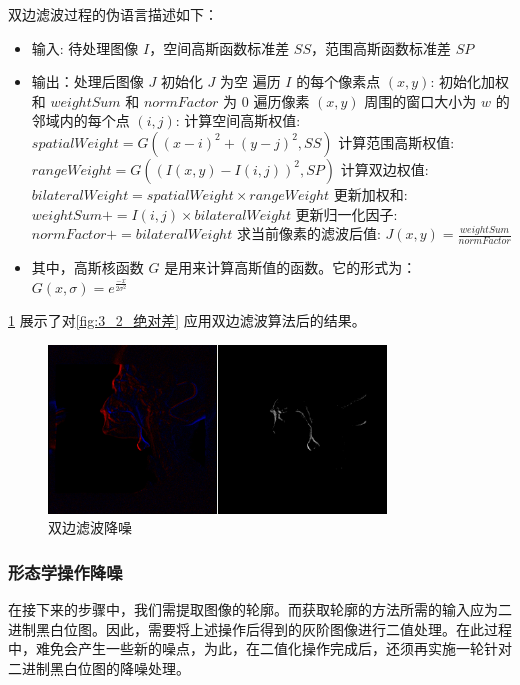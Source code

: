 双边滤波过程的伪语言描述如下：

\begin{itemize}
    \item 输入: 待处理图像 $I$，空间高斯函数标准差 $SS$，范围高斯函数标准差 $SP$
    \item 输出：处理后图像 $J$
    \subitem 初始化 $J$ 为空
    \subitem 遍历 $I$ 的每个像素点 $(x, y)$:
    \subitem 初始化加权和 $weightSum$ 和 $normFactor$ 为 0
    \subitem 遍历像素 $(x, y)$ 周围的窗口大小为 $w$ 的邻域内的每个点 $(i, j)$:
    \subsubitem 计算空间高斯权值: $spatialWeight = G((x-i)^2 + (y-j)^2, SS)$
    \subsubitem 计算范围高斯权值: $rangeWeight = G((I(x,y) - I(i,j))^2, SP)$
    \subsubitem 计算双边权值: $bilateralWeight = spatialWeight \times rangeWeight$
    \subsubitem 更新加权和: $weightSum += I(i, j) \times bilateralWeight$
    \subsubitem 更新归一化因子: $normFactor += bilateralWeight$
    \subitem 求当前像素的滤波后值: $J(x, y) = \frac{weightSum}{normFactor}$
    \item 其中，高斯核函数 $G$ 是用来计算高斯值的函数。它的形式为：$G(x, \sigma) = e^{\frac{-x}{2\sigma^2}}$
\end{itemize}

\cref{fig:3_3_双边滤波} 展示了对\cref{fig:3_2_绝对差} 应用双边滤波算法后的结果。

\begin{figure}[!htp]
    \centering
    \includegraphics[width=0.8\textwidth]{figures/3_2.png}
    \caption{双边滤波降噪}
    \label{fig:3_3_双边滤波}
\end{figure}

\subsubsection{形态学操作降噪}\label{sec:3_3_2}

在接下来的步骤中，我们需提取图像的轮廓。而获取轮廓的方法所需的输入应为二进制黑白位图。因此，需要将上述操作后得到的灰阶图像进行二值处理。在此过程中，难免会产生一些新的噪点，为此，在二值化操作完成后，还须再实施一轮针对二进制黑白位图的降噪处理。

